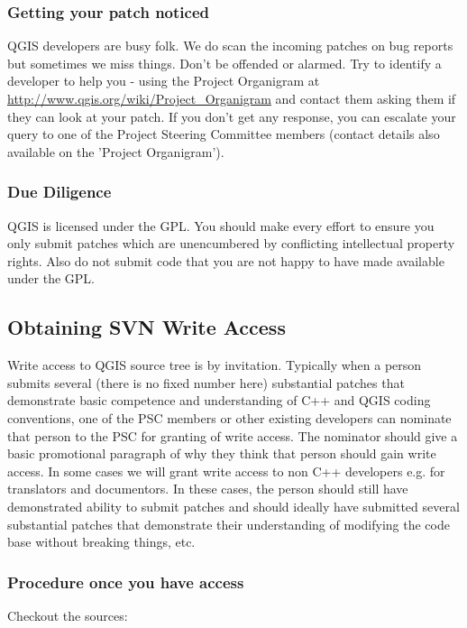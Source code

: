 \hypertarget{toc43}{}
\subsubsection{Getting your patch noticed}
QGIS developers are busy folk. We do scan the incoming patches on bug reports
but sometimes we miss things.  Don't be offended or alarmed. Try to identify a
developer to help you - using the Project Organigram at \url{http://www.qgis.org/wiki/Project_Organigram} and contact them
asking them if they can look at your patch. If you don't get any response, you
can escalate your query to one of the Project Steering Committee members
(contact details also available on the 'Project Organigram').

\hypertarget{toc44}{}
\subsubsection{Due Diligence}
QGIS is licensed under the GPL. You should make every effort to ensure you only
submit patches which are unencumbered by conflicting intellectual property
rights. Also do not submit code that you are not happy to have made available
under the GPL.

\hypertarget{toc45}{}
\subsection{Obtaining SVN Write Access}
Write access to QGIS source tree is by invitation. Typically when a person
submits several (there is no fixed number here) substantial patches that
demonstrate basic competence and understanding of C++ and QGIS coding
conventions, one of the PSC members or other existing developers can nominate
that person to the PSC for granting of write access. The nominator should give
a basic promotional paragraph of why they think that person should gain write
access. In some cases we will grant write access to non C++ developers e.g. for
translators and documentors.  In these cases, the person should still have
demonstrated ability to submit patches and should ideally have submitted several
substantial patches that demonstrate their understanding of modifying the code
base without breaking things, etc.

\hypertarget{toc46}{}
\subsubsection{Procedure once you have access}
Checkout the sources:

